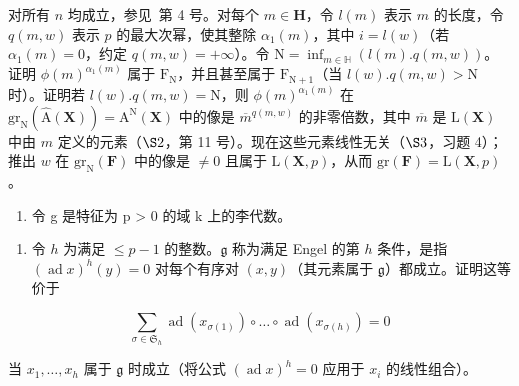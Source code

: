 对所有 \(n\) 均成立，参见~第 4 号。对每个 \(m \in \mathbf{H}\)，令 \(l(m)\) 表示 \(m\) 的长度，令 \(q(m, w)\) 表示 \(p\) 的最大次幂，使其整除 \(\alpha_{1}(m)\)，其中 \(i = l(w)\)（若 \(\alpha_{1}(m) = 0\)，约定 \(q(m, w) = +\infty\)）。令 \(\mathrm{N} = \inf_{m \in \mathbb{H}} (l(m).q(m, w))\)。证明 \(\phi(m)^{\alpha_{1}(m)}\) 属于 \(\mathrm{F}_{\mathrm{N}}\)，并且甚至属于 \(\mathrm{F}_{\mathrm{N+1}}\)（当 \(l(w).q(m, w) > \mathrm{N}\) 时）。证明若 \(l(w).q(m, w) = \mathrm{N}\)，则 \(\phi(m)^{\alpha_{1}(m)}\) 在 \(\mathrm{gr}_{\mathrm{N}}(\hat{\mathrm{A}}(\mathbf{X})) = \mathrm{A}^{\mathrm{N}}(\mathbf{X})\) 中的像是 \(\overline{m}^{q(m, w)}\) 的非零倍数，其中 \(\overline{m}\) 是 \(\mathrm{L}(\mathbf{X})\) 中由 \(m\) 定义的元素（\(\S 2\)，第 11 号）。现在这些元素线性无关（\(\S 3\)，习题 4）；推出 \(w\) 在 \(\mathrm{gr}_{\mathrm{N}}(\mathbf{F})\) 中的像是 \(\neq 0\) 且属于 \(\mathrm{L}(\mathbf{X}, p)\)，从而 \(\mathrm{gr}(\mathbf{F}) = \mathrm{L}(\mathbf{X}, p)\)。

\begin{enumerate}
\def\labelenumi{\arabic{enumi}.}
\setcounter{enumi}{11}
\tightlist
\item
  令 g 是特征为 p \textgreater{} 0 的域 k 上的李代数。
\end{enumerate}

\begin{enumerate}
\def\labelenumi{(\alph{enumi})}
\tightlist
\item
  令 \(h\) 为满足 \(\leqslant p - 1\) 的整数。\(\mathfrak{g}\) 称为满足 Engel 的第 \(h\) 条件，是指 \((\operatorname{ad} x)^h(y) = 0\) 对每个有序对 \((x, y)\)（其元素属于 \(\mathfrak{g}\)）都成立。证明这等价于
\end{enumerate}

\[
\sum_ {\sigma \in \mathfrak {S} _ {h}} \operatorname{ad} (x _ {\sigma (1)}) \circ \dots \circ \operatorname{ad} (x _ {\sigma (h)}) = 0
\]

当 \(x_1, \ldots, x_h\) 属于 \(\mathfrak{g}\) 时成立（将公式 \((\operatorname{ad} x)^h = 0\) 应用于 \(x_i\) 的线性组合）。


